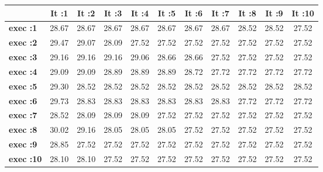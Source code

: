 \begin{tiny}\begin{tabular}{|l|c|c|c|c|c|c|c|c|c|c|}
\hline
&\textbf{It :1}&\textbf{It :2}&\textbf{It :3}&\textbf{It :4}&\textbf{It :5}&\textbf{It :6}&\textbf{It :7}&\textbf{It :8}&\textbf{It :9}&\textbf{It :10}\\\hline
\textbf{exec :1}&28.67&28.67&28.67&28.67&28.67&28.67&28.67&28.52&28.52&27.52\\\hline
\textbf{exec :2}&29.47&29.07&28.09&27.52&27.52&27.52&27.52&27.52&27.52&27.52\\\hline
\textbf{exec :3}&29.16&29.16&29.16&29.06&28.66&28.66&27.52&27.52&27.52&27.52\\\hline
\textbf{exec :4}&29.09&29.09&28.89&28.89&28.89&28.72&27.72&27.72&27.72&27.72\\\hline
\textbf{exec :5}&29.30&28.52&28.52&28.52&28.52&28.52&28.52&28.52&28.52&28.52\\\hline
\textbf{exec :6}&29.73&28.83&28.83&28.83&28.83&28.83&28.83&27.72&27.72&27.72\\\hline
\textbf{exec :7}&28.52&28.09&28.09&28.09&27.52&27.52&27.52&27.52&27.52&27.52\\\hline
\textbf{exec :8}&30.02&29.16&28.05&28.05&28.05&27.52&27.52&27.52&27.52&27.52\\\hline
\textbf{exec :9}&28.85&27.52&27.52&27.52&27.52&27.52&27.52&27.52&27.52&27.52\\\hline
\textbf{exec :10}&28.10&28.10&27.52&27.52&27.52&27.52&27.52&27.52&27.52&27.52\\\hline
\end{tabular}
\end{tiny}